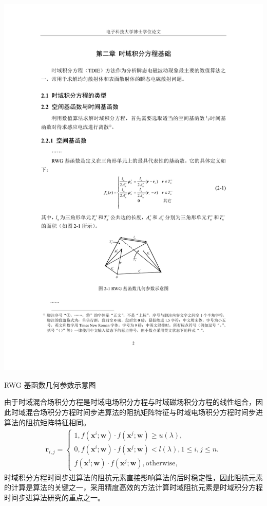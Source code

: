 \documentclass[doctor]{thesisUESTC}
\begin{document}
\begin{graphic}[h]
\includegraphics{pica.pdf}
\caption{RWG 基函数几何参数示意图}
\label{pica}
\end{graphic}
由于时域混合场积分方程是时域电场积分方程与时域磁场积分方程的线性组合，因此时域混合场积分方程时间步进算法的阻抗矩阵特征与时域电场积分方程时间步进算法的阻抗矩阵特征相同。
\begin{equation}
\begin{aligned}\label{latent_binary_variable}
\mathbf{r}_{i,j}=
\begin{cases}
1,f(\mathbf{x}^{i};\mathbf{w})\cdot f(\mathbf{x}^{j};\mathbf{w})\geq u(\lambda),\\
0,f(\mathbf{x}^{i};\mathbf{w})\cdot f(\mathbf{x}^{j};\mathbf{w})< l(\lambda), 1\leq i,j\leq n.\\
f(\mathbf{x}^{i};\mathbf{w})\cdot f(\mathbf{x}^{j};\mathbf{w}),\text{otherwise},
\end{cases}
\end{aligned}
\end{equation}
时域积分方程时间步进算法的阻抗元素直接影响算法的后时稳定性，因此阻抗元素的计算是算法的关键之一，采用精度高效的方法计算时域阻抗元素是时域积分方程时间步进算法研究的重点之一。
\end{document}
